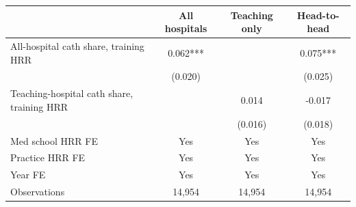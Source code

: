
\begin{tabular}{lccc}
\toprule
 & All hospitals & Teaching only & Head-to-head\\
\midrule
All-hospital cath share, training HRR & 0.062*** &  & 0.075***\\
 & (0.020) &  & (0.025)\\
Teaching-hospital cath share, training HRR &  & 0.014 & -0.017\\
 &  & (0.016) & (0.018)\\
\midrule
Med school HRR FE & Yes & Yes & Yes\\
Practice HRR FE & Yes & Yes & Yes\\
Year FE & Yes & Yes & Yes\\
Observations & 14,954 & 14,954 & 14,954\\
\bottomrule
\end{tabular}
